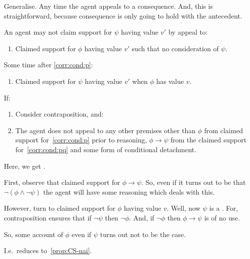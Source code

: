 \begin{note}
  Generalise.
  Any time the agent appeals to a consequence.
  And, this is straightforward, because consequence is only going to hold with the antecedent.

  \begin{corollary}\label{corr:eiS:C:contraposition}
    An agent may not claim support for \(\psi\) having value \(v'\) by appeal to:
    \begin{enumerate}[label=\arabic*., ref=(\arabic*)]
       \item\label{corr:cond:p} Claimed support for \(\phi\) having value \(v'\) such that no consideration of \(\psi\).
    \end{enumerate}

    Some time after \ref{corr:cond:p}:

    \begin{enumerate}[resume]
  \item\label{corr:cond:pq} Claimed support for \(\psi\) having value \(v'\) when \(\phi\) has value \(v\).
    \end{enumerate}

    If:
    \begin{enumerate}[resume]
    \item Consider contraposition, and:
    \item The agent does not appeal to any other premises other than \(\phi\) from claimed support for~\ref{corr:cond:p} prior to reasoning, \(\phi \rightarrow \psi\) from the claimed support for~\ref{corr:cond:pq} and some form of conditional detachment.
    \end{enumerate}
    \vspace{-\baselineskip}
  \end{corollary}

  Here, we get \expec{}.

  First, observe that claimed support for \(\phi \rightarrow \psi\).
  So, even if it turns out to be that \(\lnot(\phi \land \lnot\psi)\) the agent will have some reasoning which deals with this.

  However, turn to claimed support for \(\phi\) having value \(v\).
  Well, now \(\psi\) is a \requ{}.
  For, contraposition ensures that if \(\lnot\psi\) then \(\lnot\phi\).
  And, if \(\lnot\phi\) then \(\phi \rightarrow \psi\) is of no use.

  So, some account of \(\phi\) even if \(\psi\) turns out not to be the case.

  I.e.\ reduces to~\autoref{prop:CS-nai}.
\end{note}

